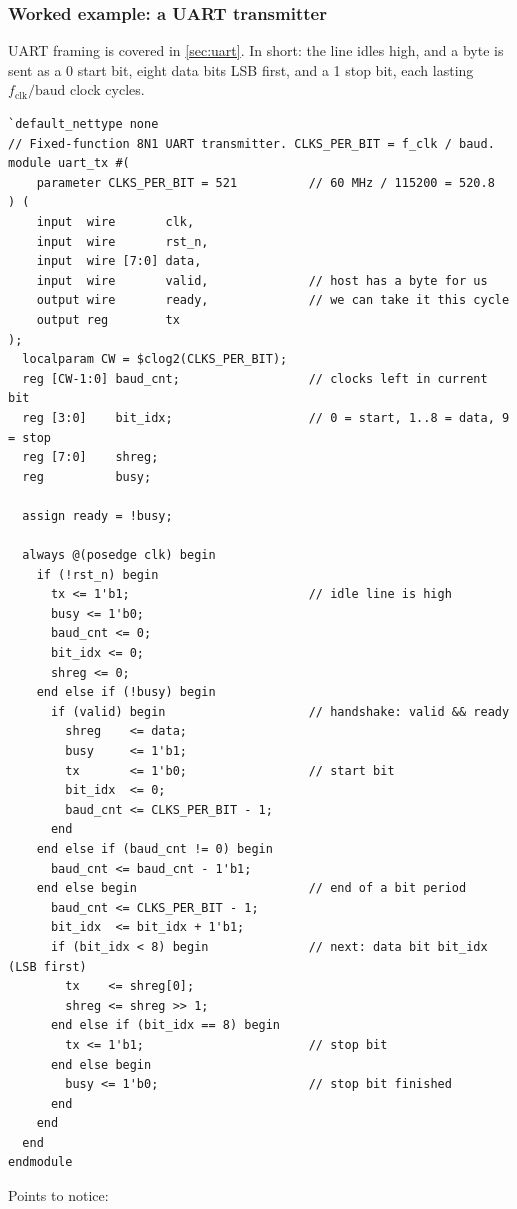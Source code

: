 \subsubsection{Worked example: a UART transmitter}\label{sec:uarttx}

UART framing is covered in \cref{sec:uart}. In short: the line idles high,
and a byte is sent as a 0 start bit, eight data bits LSB first, and a 1 stop
bit, each lasting $f_{\mathrm{clk}}/\text{baud}$ clock cycles.
{\small
\begin{verbatim}
`default_nettype none
// Fixed-function 8N1 UART transmitter. CLKS_PER_BIT = f_clk / baud.
module uart_tx #(
    parameter CLKS_PER_BIT = 521          // 60 MHz / 115200 = 520.8
) (
    input  wire       clk,
    input  wire       rst_n,
    input  wire [7:0] data,
    input  wire       valid,              // host has a byte for us
    output wire       ready,              // we can take it this cycle
    output reg        tx
);
  localparam CW = $clog2(CLKS_PER_BIT);
  reg [CW-1:0] baud_cnt;                  // clocks left in current bit
  reg [3:0]    bit_idx;                   // 0 = start, 1..8 = data, 9 = stop
  reg [7:0]    shreg;
  reg          busy;

  assign ready = !busy;

  always @(posedge clk) begin
    if (!rst_n) begin
      tx <= 1'b1;                         // idle line is high
      busy <= 1'b0;
      baud_cnt <= 0;
      bit_idx <= 0;
      shreg <= 0;
    end else if (!busy) begin
      if (valid) begin                    // handshake: valid && ready
        shreg    <= data;
        busy     <= 1'b1;
        tx       <= 1'b0;                 // start bit
        bit_idx  <= 0;
        baud_cnt <= CLKS_PER_BIT - 1;
      end
    end else if (baud_cnt != 0) begin
      baud_cnt <= baud_cnt - 1'b1;
    end else begin                        // end of a bit period
      baud_cnt <= CLKS_PER_BIT - 1;
      bit_idx  <= bit_idx + 1'b1;
      if (bit_idx < 8) begin              // next: data bit bit_idx (LSB first)
        tx    <= shreg[0];
        shreg <= shreg >> 1;
      end else if (bit_idx == 8) begin
        tx <= 1'b1;                       // stop bit
      end else begin
        busy <= 1'b0;                     // stop bit finished
      end
    end
  end
endmodule
\end{verbatim}
}
Points to notice:
